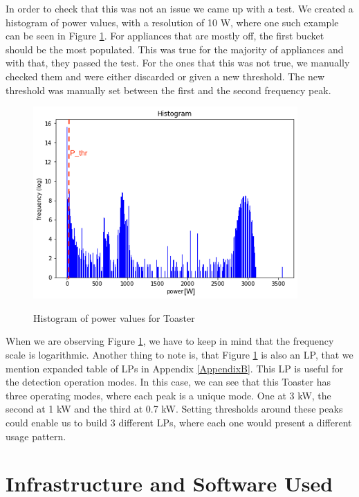 In order to check that this was not an issue we came up with a test.
We created a histogram of power values, with a resolution of 10 W, where one such example can be seen in Figure \ref{fig:freq_pthr}.
For appliances that are mostly off, the first bucket should be the most populated.
This was true for the majority of appliances and with that, they passed the test.
For the ones that this was not true, we manually checked them and were either discarded or given a new threshold.
The new threshold was manually set between the first and the second frequency peak. 

\begin{figure}[H]
	\centering
	\caption{Histogram of power values for Toaster}
	\includegraphics[width=0.9\textwidth]{Figures/profile_sketches/freq_pthr.png}
	\label{fig:freq_pthr}
\end{figure}

When we are observing Figure \ref{fig:freq_pthr}, we have to keep in mind that the frequency scale is logarithmic.
Another thing to note is, that Figure \ref{fig:freq_pthr} is also an LP, that we mention expanded table of LPs in Appendix \ref{AppendixB}.
This LP is useful for the detection operation modes.
In this case, we can see that this Toaster has three operating modes, where each peak is a unique mode.
One at 3 kW, the second at 1 kW and the third at 0.7 kW.
Setting thresholds around these peaks could enable us to build 3 different LPs, where each one would present a different usage pattern.

\section{Infrastructure and Software Used}

